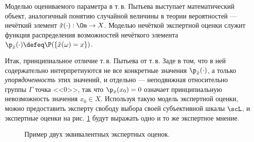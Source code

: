 Моделью оцениваемого параметра в т.\,в. Пытьева выступает математический объект, аналогичный понятию случайной величины в теории вероятностей --- нечёткий элемент $\tilde x(\cdot): \Om \rightarrow X$. Моделью нечёткой экспертной оценки служит функция распределения возможностей нечёткого элемента $\p_{\tilde x}(\cdot) \defeq \P(\{\tilde x(\omega) = x\})$. 

Итак, принципиальное отличие т.\,в. Пытьева от т.\,в. Заде в том, что в ней содержательно интерпретиуются не все конкретные значения $\p_{\tilde x}(\cdot)$, а только {\sl упорядоченность} этих значений, и отдельно --- неподвижная относительно группы $\Gamma$ точка <<0>>, так что $\p_{\tilde x}(x_0) = 0$ означает принципиальную невозможность значения $x_0 \in X$. Используя такую модель экспертной оценки, можно предоставить эксперту свободу выбора своей субъективной шкалы $\scL$, и экспертные оценки на рис. \ref{ris:fuzzy_ass03} будут выражать одно и то же экспертное мнение.

\begin{figure}[h]
\caption{\small Пример двух эквивалентных экспертных оценок.}
\label{ris:fuzzy_ass03}
\end{figure}
